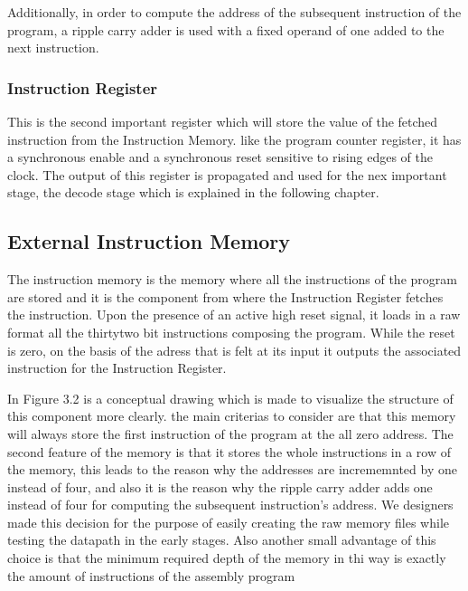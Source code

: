 Additionally, in order to compute the address of the subsequent instruction of the program, a ripple carry adder is used with a fixed operand of one added
to the next instruction.

\subsubsection{ Instruction Register }

This is the second important register which will store the value of the fetched instruction from the Instruction Memory. like the program counter register,
it has a synchronous enable and a synchronous reset sensitive to rising edges of the clock. The output of this register is propagated and used for the nex important stage,
the decode stage which is explained in the following chapter. 

\subsection{External Instruction Memory}

The instruction memory is the memory where all the instructions of the program are stored and it is the component from where the Instruction Register fetches the 
instruction. Upon the presence of an active high reset signal, it loads in a raw format all the thirtytwo bit instructions composing the program. While the reset is zero,
on the basis of the adress that is felt at its input it outputs the associated instruction for the Instruction Register.

In Figure 3.2 is a conceptual drawing which is made to visualize the structure of this component more clearly. the main criterias to consider are that this
memory will always store the first instruction of the program at the all zero address. The second feature of the memory is that it stores the whole instructions
in a row of the memory, this leads to the reason why the addresses are incrememnted by one instead of four, and also it is the reason why the
ripple carry adder adds one instead of four for computing the subsequent instruction's address. We designers made this decision for the purpose of easily creating the
raw memory files while testing the datapath in the early stages. Also another small advantage of this choice is that the minimum required depth of the memory in thi way is exactly the amount
of instructions of the assembly program

